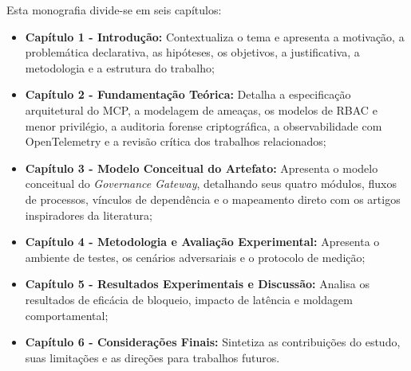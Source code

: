 Esta monografia divide-se em seis capítulos:
\begin{itemize}
  \item \textbf{Capítulo 1 - Introdução:} Contextualiza o tema e apresenta a motivação, a problemática declarativa, as hipóteses, os objetivos, a justificativa, a metodologia e a estrutura do trabalho;
  \item \textbf{Capítulo 2 - Fundamentação Teórica:} Detalha a especificação arquitetural do MCP, a modelagem de ameaças, os modelos de RBAC e menor privilégio, a auditoria forense criptográfica, a observabilidade com OpenTelemetry e a revisão crítica dos trabalhos relacionados;
  \item \textbf{Capítulo 3 - Modelo Conceitual do Artefato:} Apresenta o modelo conceitual do \textit{Governance Gateway}, detalhando seus quatro módulos, fluxos de processos, vínculos de dependência e o mapeamento direto com os artigos inspiradores da literatura;
  \item \textbf{Capítulo 4 - Metodologia e Avaliação Experimental:} Apresenta o ambiente de testes, os cenários adversariais e o protocolo de medição;
  \item \textbf{Capítulo 5 - Resultados Experimentais e Discussão:} Analisa os resultados de eficácia de bloqueio, impacto de latência e moldagem comportamental;
  \item \textbf{Capítulo 6 - Considerações Finais:} Sintetiza as contribuições do estudo, suas limitações e as direções para trabalhos futuros.
\end{itemize}
